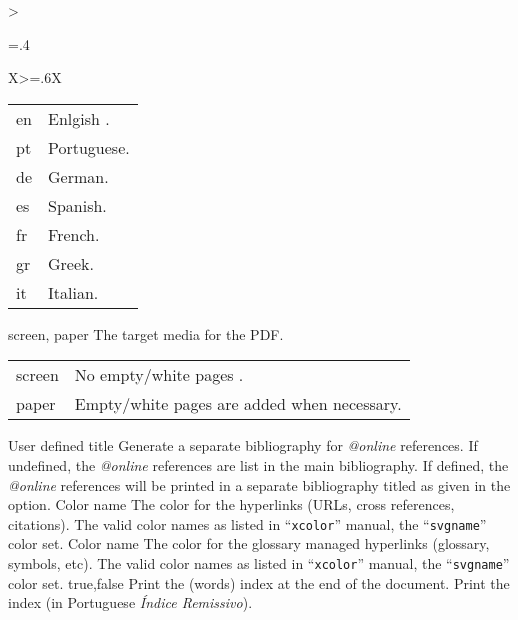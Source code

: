 \begin{xltabular}{\linewidth}{>{\hsize=.4\hsize\raggedright\arraybackslash}X>{\hsize=.6\hsize}X}
{\begin{tabular}{@{}l@{ $\rightarrow$ }X@{}}
         en & Enlgish .\\
         pt & Portuguese.\\
         de & German.\\
         es & Spanish.\\
         fr & French.\\
         gr & Greek.\\
         it & Italian.\\
    \end{tabular}
    }
    \midrule
    {screen, paper}%
    {The target media for the PDF.}%
	{%
    \begin{tabular}{@{}l@{ $\rightarrow$ }X@{}}
         screen & No empty/white pages .\\
         paper  & Empty/white pages are added when necessary.\\
    \end{tabular}
    }
    \midrule
    {User defined title}%
    {Generate a separate bibliography for \emph{@online} references.}%
	{%
		If undefined, the \emph{@online} references are list in the main bibliography.  If defined, the \emph{@online} references will be printed in a separate bibliography titled as given in the option.
    }
    \midrule
    {Color name}%
    {The color for the hyperlinks (URLs, cross references, citations).}%
	{%
		The valid color names as listed in “\texttt{xcolor}” manual, the “\texttt{svgname}” color set.
    }
    \midrule
    {Color name}%
    {The color for the glossary managed hyperlinks (glossary, symbols, etc).}%
	{%
		The valid color names as listed in “\texttt{xcolor}” manual, the “\texttt{svgname}” color set.
    }
    \midrule
    {true,\newline false }%
    {Print the (words) index at the end of the document.}%
	{%
		Print the index (in Portuguese \emph{Índice Remissivo}).
    }
    \bottomrule
\end{xltabular}
\egroup


